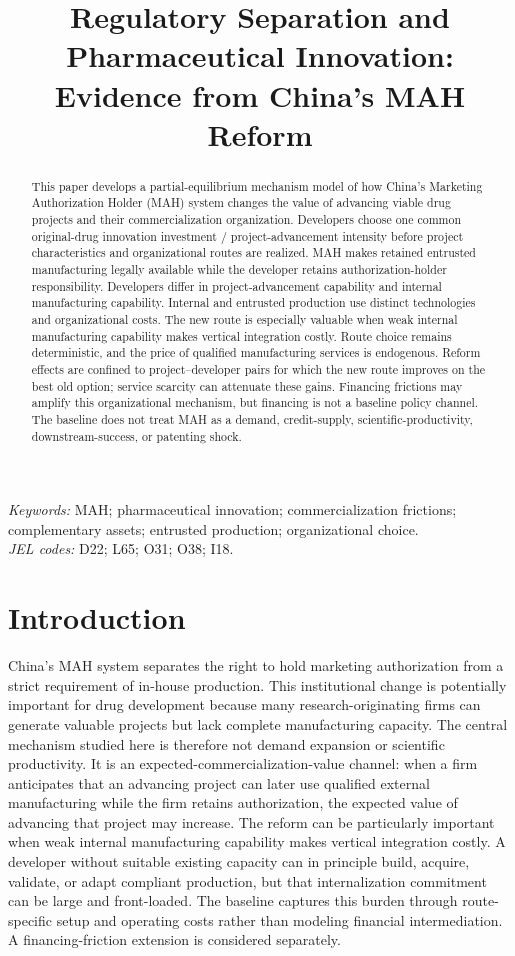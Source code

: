 \documentclass[12pt]{article}
\title{Regulatory Separation and Pharmaceutical Innovation: Evidence from China's MAH Reform}
\author{}
\date{}
\newcommand{\1}{\mathbf{1}}
\begin{document}
\maketitle
\thispagestyle{plain}

\begin{abstract}
\noindent
This paper develops a partial-equilibrium mechanism model of how China's
Marketing Authorization Holder (MAH) system changes the value of advancing
viable drug projects and their commercialization organization. Developers
choose one common original-drug innovation investment / project-advancement
intensity before project characteristics and organizational routes are
realized. MAH makes retained entrusted manufacturing legally available while
the developer retains authorization-holder responsibility. Developers differ
in project-advancement capability and internal manufacturing capability.
Internal and entrusted production use distinct technologies and organizational
costs. The new route is especially valuable when weak internal manufacturing
capability makes vertical integration costly. Route choice remains
deterministic, and the price of qualified manufacturing services is
endogenous. Reform effects are confined to project--developer pairs for which
the new route improves on the best old option; service scarcity can attenuate
these gains. Financing frictions may amplify this organizational mechanism,
but financing is not a baseline policy channel. The baseline does not treat
MAH as a demand, credit-supply, scientific-productivity, downstream-success,
or patenting shock.
\end{abstract}

\noindent\textit{Keywords:} MAH; pharmaceutical innovation; commercialization frictions; complementary assets; entrusted production; organizational choice.\\
\noindent\textit{JEL codes:} D22; L65; O31; O38; I18.

\section{Introduction}

China's MAH system separates the right to hold marketing authorization from a
strict requirement of in-house production. This institutional change is
potentially important for drug development because many research-originating
firms can generate valuable projects but lack complete manufacturing
capacity. The central mechanism studied here is therefore not demand expansion
or scientific productivity. It is an expected-commercialization-value
channel: when a firm anticipates that an advancing project can later use
qualified external manufacturing while the firm retains authorization, the
expected value of advancing that project may increase. The reform can be
particularly important when weak internal manufacturing capability makes
vertical integration costly. A developer without suitable existing capacity
can in principle build, acquire, validate, or adapt compliant production, but
that internalization commitment can be large and front-loaded. The baseline
captures this burden through route-specific setup and operating costs rather
than modeling financial intermediation. A financing-friction extension is
considered separately.
\end{document}
